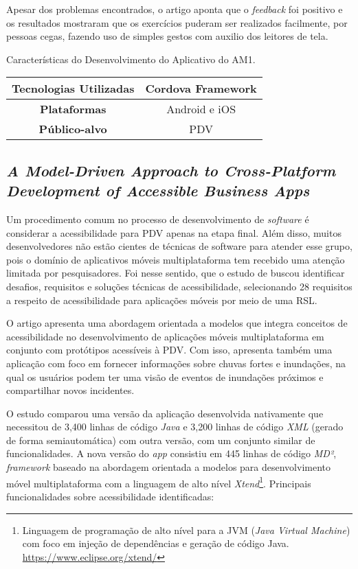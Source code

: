 Apesar dos problemas encontrados, o artigo aponta que o \emph{feedback} foi positivo e os resultados mostraram que os exercícios puderam ser realizados facilmente, por pessoas cegas,
fazendo uso de simples gestos com auxilio dos leitores de tela.

\begin{quadro}[htb!]
  \caption{\label{qua-car-am1}Características do Desenvolvimento do Aplicativo do AM1.}
  \begin{tabular}{|c|c|}
    \hline
    \textbf{Tecnologias Utilizadas} & Cordova Framework \\ \hline
    \textbf{Plataformas}            & Android e iOS     \\ \hline
    \textbf{Público-alvo}           & PDV               \\
    \hline
  \end{tabular}
\end{quadro}

\subsection{\emph{A Model-Driven Approach to Cross-Platform Development of Accessible Business Apps}}

Um procedimento comum no processo de desenvolvimento de \emph{software} é considerar a acessibilidade para PDV apenas na etapa final.
Além disso, muitos desenvolvedores não estão cientes de técnicas de software para atender esse grupo, pois o domínio de aplicativos
móveis multiplataforma tem recebido uma atenção limitada por pesquisadores. Foi nesse sentido, que o estudo de 
buscou identificar desafios, requisitos e soluções técnicas de acessibilidade, selecionando 28 requisitos a respeito de acessibilidade para
aplicações móveis por meio de uma RSL\@.

O artigo apresenta uma abordagem orientada a modelos que integra conceitos de acessibilidade no desenvolvimento de aplicações móveis multiplataforma em conjunto com protótipos
acessíveis à PDV\@. Com isso, apresenta também uma aplicação com foco em fornecer informações sobre chuvas fortes e inundações, na qual
os usuários podem ter uma visão de eventos de inundações próximos e compartilhar novos incidentes.

O estudo comparou uma versão da aplicação desenvolvida nativamente que necessitou de 3,400 linhas de código \emph{Java} e 3,200 linhas de código \emph{XML}
(gerado de forma semiautomática) com outra versão, com um conjunto similar de funcionalidades. A nova versão do \emph{app} consistiu em 445 linhas de código \emph{MD²}, \emph{framework}
baseado na abordagem orientada a modelos para desenvolvimento móvel multiplataforma com a linguagem de alto nível \emph{Xtend}\footnote{
  Linguagem de programação de alto nível para a JVM (\emph{Java Virtual Machine}) com foco em injeção de dependências e geração de código Java. \url{https://www.eclipse.org/xtend/}}.
Principais funcionalidades sobre acessibilidade identificadas:

